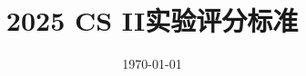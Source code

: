 \documentclass[fontset=ubuntu,lang=cn,12pt]{elegantbook}
\title{2025 CS II实验评分标准}
\author{}
\institute{浙江大学}
\date{\today}
\begin{document}
\begin{titlepage}
%
\end{titlepage}
\frontmatter
\mainmatter




\tableofcontents

  
  
 



\appendix

\end{document}
